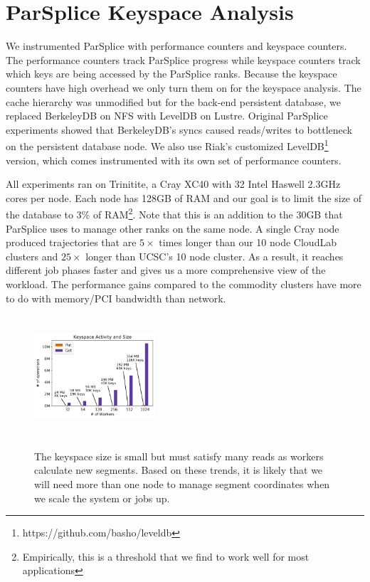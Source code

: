 \section{ParSplice Keyspace Analysis}
\label{sec:parsplice-keyspace-analysis}

We instrumented ParSplice with performance counters and keyspace counters.  The
performance counters track ParSplice progress while keyspace counters track
which keys are being accessed by the ParSplice ranks. Because the keyspace
counters have high overhead we only turn them on for the keyspace analysis.
The cache hierarchy was unmodified but for the back-end persistent database, we
replaced BerkeleyDB on NFS with LevelDB on Lustre. Original ParSplice
experiments showed that BerkeleyDB's syncs caused reads/writes to bottleneck on
the persistent database node. We also use Riak's customized
LevelDB\footnote{https://github.com/basho/leveldb} version, which comes
instrumented with its own set of performance counters.

All experiments ran on Trinitite, a Cray XC40 with 32 Intel Haswell 2.3GHz
cores per node.  Each node has 128GB of RAM and our goal is to limit the size
of the database to 3\% of RAM\footnote{Empirically, this is a threshold that we
find to work well for most applications}. Note that this is an addition to the
30GB that ParSplice uses to manage other ranks on the same node.  A single Cray
node produced trajectories that are \(5\times\) times longer than our 10 node
CloudLab clusters and \(25\times\) longer than UCSC's 10 node cluster. As
a result, it reaches different job phases faster and gives us a more
comprehensive view of the workload. The performance gains compared to the
commodity clusters have more to do with memory/PCI bandwidth than network.

\begin{figure}[t]
  \noindent\includegraphics[height=4.5cm,width=0.4\textwidth]{figures/methodology-keyspace.png}\\
  \caption{The keyspace size is small but must satisfy many reads as workers
  calculate new segments. Based on these trends, it is likely that we will need
  more than one node to manage segment coordinates when we scale the system or jobs up.
  \label{fig:methodology-keyspace}}
\end{figure}

